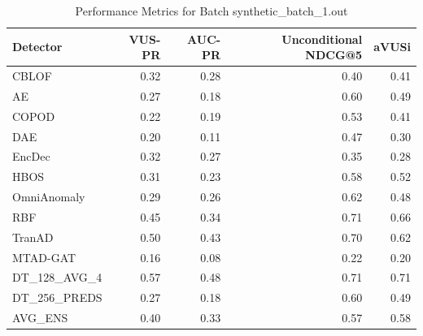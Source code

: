 \begin{table}
\centering
\caption{Performance Metrics for Batch synthetic_batch_1.out}
\label{tab:example_metrics}
\begin{tabular}{lrrrr}
\toprule
    Detector &  VUS-PR &  AUC-PR &  Unconditional NDCG@5 &  aVUSi \\
\midrule
       CBLOF &    0.32 &    0.28 &                  0.40 &   0.41 \\
          AE &    0.27 &    0.18 &                  0.60 &   0.49 \\
       COPOD &    0.22 &    0.19 &                  0.53 &   0.41 \\
         DAE &    0.20 &    0.11 &                  0.47 &   0.30 \\
      EncDec &    0.32 &    0.27 &                  0.35 &   0.28 \\
        HBOS &    0.31 &    0.23 &                  0.58 &   0.52 \\
 OmniAnomaly &    0.29 &    0.26 &                  0.62 &   0.48 \\
         RBF &    0.45 &    0.34 &                  0.71 &   0.66 \\
      TranAD &    0.50 &    0.43 &                  0.70 &   0.62 \\
    MTAD-GAT &    0.16 &    0.08 &                  0.22 &   0.20 \\
DT\_128\_AVG\_4 &    0.57 &    0.48 &                  0.71 &   0.71 \\
DT\_256\_PREDS &    0.27 &    0.18 &                  0.60 &   0.49 \\
     AVG\_ENS &    0.40 &    0.33 &                  0.57 &   0.58 \\
\bottomrule
\end{tabular}
\end{table}
